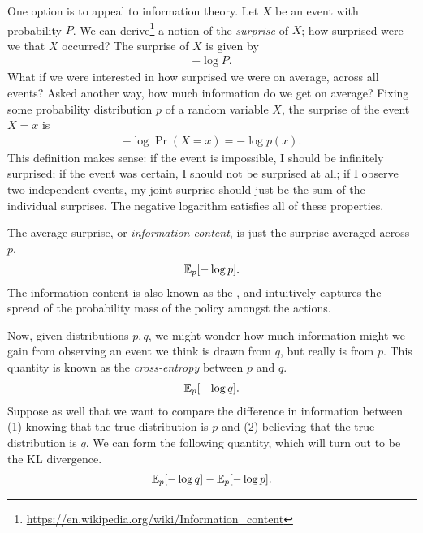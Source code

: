 \documentclass[\main/thesis.tex]{subfiles}
\begin{document}
One option is to appeal to information theory. Let $X$ be an event with probability $P$. We can derive\footnote{\url{https://en.wikipedia.org/wiki/Information_content}} a notion of the \textit{surprise} of $X$; how surprised were we that $X$ occurred? The surprise of $X$ is given by 
\begin{align*}
    -\log P.
\end{align*}
What if we were interested in how surprised we were on average, across all events? Asked another way, how much information do we get on average? Fixing some probability distribution $p$ of a random variable $X$, the surprise of the event $X = x$ is 
\begin{align*}
    -\log \Pr(X = x) = -\log p(x).
\end{align*}
This definition makes sense: if the event is impossible, I should be infinitely surprised; if the event was certain, I should not be surprised at all; if I observe two independent events, my joint surprise should just be the sum of the individual surprises. The negative logarithm satisfies all of these properties. 

The average surprise, or \textit{information content}, is just the surprise averaged across $p$.
\begin{align*}
    \mathbb{E}_p[-\log p].
\end{align*}
The information content is also known as the , and intuitively captures the spread of the probability mass of the policy amongst the actions.

Now, given distributions $p, q$, we might wonder how much information might we gain from observing an event we think is drawn from $q$, but really is from $p$. This quantity is known as the \textit{cross-entropy} between $p$ and $q$.
\begin{align*}
    \mathbb{E}_p[-\log q].
\end{align*}
Suppose as well that we want to compare the difference in information between (1) knowing that the true distribution is $p$ and (2) believing that the true distribution is $q$. We can form the following quantity, which will turn out to be the KL divergence.
\begin{align*}
    \mathbb{E}_p[-\log q] - \mathbb{E}_p[-\log p].
\end{align*}
\end{document}
